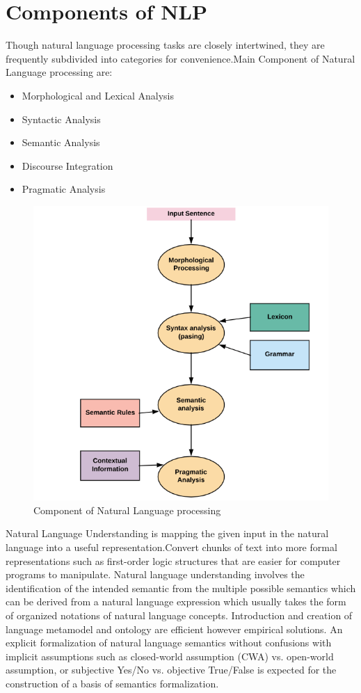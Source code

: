 \section{Components of NLP}
Though natural language processing tasks are closely intertwined, they are frequently subdivided into categories for convenience.Main Component of Natural Language processing are:
\begin{itemize}
  \item Morphological and Lexical Analysis
  \item Syntactic Analysis
\item Semantic Analysis
\item Discourse Integration
\item Pragmatic Analysis

\end{itemize}
\begin{figure}[h]
	\begin{center}
		\includegraphics[width =15.5cm]{6.PNG}
		\caption{Component of Natural Language processing }
		\label{ab}
	\end{center}
\end{figure}

Natural Language Understanding is mapping the given input in the natural language into a useful representation.Convert chunks of text into more formal representations such as first-order logic structures that are easier for computer programs to manipulate. Natural language understanding involves the identification of the intended semantic from the multiple possible semantics which can be derived from a natural language expression which usually takes the form of organized notations of natural language concepts. Introduction and creation of language metamodel and ontology are efficient however empirical solutions. An explicit formalization of natural language semantics without confusions with implicit assumptions such as closed-world assumption (CWA) vs. open-world assumption, or subjective Yes/No vs. objective True/False is expected for the construction of a basis of semantics formalization.\\
